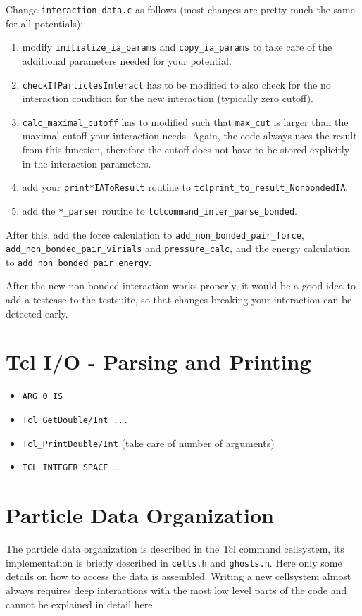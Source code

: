 \documentclass[
a4paper,                        %
11pt,                           %
twoside,                        %
footsepline,                    %
headsepline,                    %
headexclude,                    %
footexclude,                    %
pagesize,                       %
bibtotocnumbered,               %
idxtotoc                        %
]{scrreprt}
\begin{document}
Change \verb!interaction_data.c! as follows (most changes are pretty
much the same for all potentials):
\begin{enumerate}
\item modify \verb!initialize_ia_params! and \verb!copy_ia_params! to
  take care of the additional parameters needed for your potential.
\item \verb!checkIfParticlesInteract! has to be modified to also check
  for the no interaction condition for the new interaction (typically
  zero cutoff).
\item \verb!calc_maximal_cutoff! has to modified such that
  \verb!max_cut! is larger than the maximal cutoff your interaction
  needs. Again, the code always uses the result from this function,
  therefore the cutoff does not have to be stored explicitly in the
  interaction parameters.
\item add your \verb!print*IAToResult! routine to
  \verb!tclprint_to_result_NonbondedIA!.
\item add the \verb!*_parser! routine to
  \verb!tclcommand_inter_parse_bonded!.
\end{enumerate}

After this, add the force calculation to
\verb!add_non_bonded_pair_force!, \verb!add_non_bonded_pair_virials!
and \verb!pressure_calc!, and the energy calculation to
\verb!add_non_bonded_pair_energy!.

After the new non-bonded interaction works properly, it would be a
good idea to add a testcase to the testsuite, so that changes breaking
your interaction can be detected early.

\section{Tcl I/O - Parsing and Printing}
\begin{itemize}
\item \verb!ARG_0_IS!
\item \verb!Tcl_GetDouble/Int ...!
\item \verb!Tcl_PrintDouble/Int! (take care of number of arguments)
\item \verb!TCL_INTEGER_SPACE! ...
\end{itemize}

\section{Particle Data Organization}

The particle data organization is described in the Tcl command
cellsystem, its implementation is briefly described in
\texttt{cells.h} and \texttt{ghosts.h}. Here only some details on how
to access the data is assembled. Writing a new cellsystem almost
always requires deep interactions with the most low level parts of the
code and cannot be explained in detail here.
\end{document}
